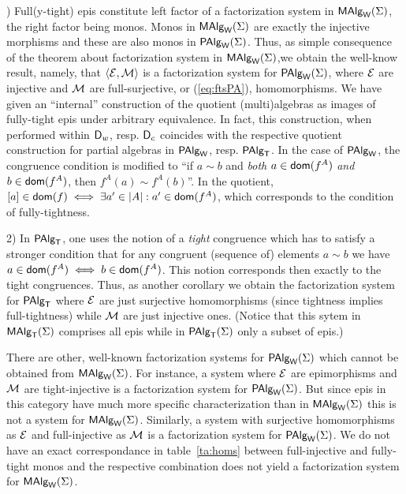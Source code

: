 \documentclass[10pt]{article}
\begin{document}
) Full(y-tight) epis constitute left factor of a factorization system
in $\mbox{\rm\sf MAlg}_{\sf W}(\Sigma)$, the right factor being monos. Monos in $\mbox{\rm\sf MAlg}_{\sf W}(\Sigma)$ are exactly
the injective morphisms and these are also monos in $\mbox{\rm\sf PAlg}_{\sf W}(\Sigma)$. Thus, as
simple consequence of the theorem about factorization system in
$\mbox{\rm\sf MAlg}_{\sf W}(\Sigma)$,we obtain the well-know result, namely, that $\langle{\cal E},{\cal M}\rangle$
is a factorization system for $\mbox{\rm\sf PAlg}_{\sf W}(\Sigma)$, where ${\cal E}$ are injective and
${\cal M}$ are full-surjective, or (\ref{eq:ftsPA}), homomorphisms.  We
have given an ``internal'' construction of the quotient
(multi)algebras as images of fully-tight epis under arbitrary
equivalence. In fact, this construction, when performed within
$\mbox{\rm\sf D}_w$, resp.  $\mbox{\rm\sf D}_c$ coincides with the respective quotient
construction for partial algebras in $\mbox{\rm\sf PAlg}_{\sf W}$, resp. $\mbox{\rm\sf PAlg}_{\sf T}$.  In the
case of $\mbox{\rm\sf PAlg}_{\sf W}$, the congruence condition is modified to ``if $a \sim
b$ and {\em both} $a\in\mbox{\sf dom}(f^A)$ {\em and} $b\in\mbox{\sf dom}(f^A)$,
then $f^A(a)\sim f^A(b)$''. In the quotient, $[a]\in\mbox{\sf dom}(f) \iff
\exists a'\in|A|:a'\in\mbox{\sf dom}(f^A)$, which corresponds to the
condition of fully-tightness. 

\medskip

2) In $\mbox{\rm\sf PAlg}_{\sf T}$, one uses the notion of a {\em tight} congruence which
has to satisfy a stronger condition that for any congruent (sequence
of) elements $a\sim b$ we have $a\in \mbox{\sf dom}(f^A)\iff
b\in\mbox{\sf dom}(f^A)$. This notion corresponds then exactly to the tight
congruences.  Thus, as another corollary we obtain the factorization
system for $\mbox{\rm\sf PAlg}_{\sf T}$ where ${\cal E}$ are just surjective homomorphisms
(since tightness implies full-tightness) while ${\cal M}$ are just
injective ones. (Notice that this sytem in $\mbox{\rm\sf MAlg}_{\sf T}(\Sigma)$ comprises all epis
while in $\mbox{\rm\sf PAlg}_{\sf T}(\Sigma)$ only a subset of epis.) \vspace*{1ex}

There are other, well-known factorization systems for $\mbox{\rm\sf PAlg}_{\sf W}(\Sigma)$ which
cannot be obtained from $\mbox{\rm\sf MAlg}_{\sf W}(\Sigma)$. For instance, a system where ${\cal E}$
are epimorphisms and ${\cal M}$ are tight-injective is a factorization
system for $\mbox{\rm\sf PAlg}_{\sf W}(\Sigma)$. But since epis in this category have much more
specific characterization than in $\mbox{\rm\sf MAlg}_{\sf W}(\Sigma)$ this is not a system for
$\mbox{\rm\sf MAlg}_{\sf W}(\Sigma)$.  Similarly, a system with surjective homomorphisms as ${\cal E}$ and
full-injective as ${\cal M}$ is a factorization system for $\mbox{\rm\sf PAlg}_{\sf W}(\Sigma)$. We do
not have an exact correspondance in table~\ref{ta:homs} between
full-injective and fully-tight monos and the respective combination
does not yield a factorization system for $\mbox{\rm\sf MAlg}_{\sf W}(\Sigma)$.


\end{document}
